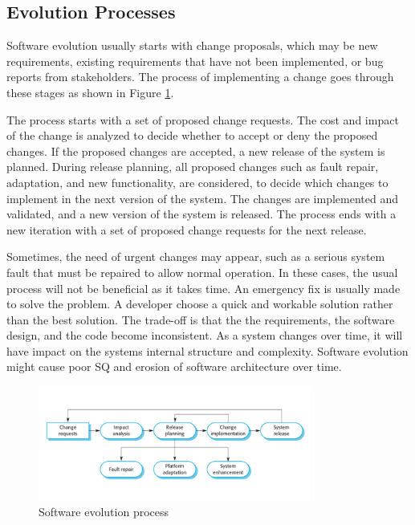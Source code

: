 {\subsection{Evolution Processes}
Software evolution usually starts with change proposals, which may be new requirements, existing requirements that have not been implemented, or bug reports from stakeholders. The process of implementing a change goes through these stages\cite{Sommerville:2011:SE} as shown in Figure \ref{fig:seProcess}.

The process starts with a set of proposed change requests. The cost and impact of the change is analyzed to decide whether to accept or deny the proposed changes. If the proposed changes are accepted, a new release of the system is planned. During release planning, all proposed changes such as fault repair, adaptation, and new functionality, are considered, to decide which changes to implement in the next version of the system. The changes are implemented and validated, and a new version of the system is released. The process ends with a new iteration with a set of proposed change requests for the next release. 

Sometimes, the need of urgent changes may appear, such as a serious system fault that must be repaired to allow normal operation. In these cases, the usual process will not be beneficial as it takes time. An emergency fix is usually made to solve the problem. A developer choose a quick and workable solution rather than the best solution. The trade-off is that the the requirements, the software design, and the code become inconsistent. As a system changes over time, it will have impact on the systems internal structure and complexity. Software evolution might cause poor SQ and erosion of software architecture over time\cite{Bass:2012:SAP:2392670}.

\begin{figure}[h!]
	\centering
	\includegraphics[width=0.8\textwidth]{images/SEprocess.png}
	\caption{Software evolution process}
	\label{fig:seProcess}
\end{figure}


}
